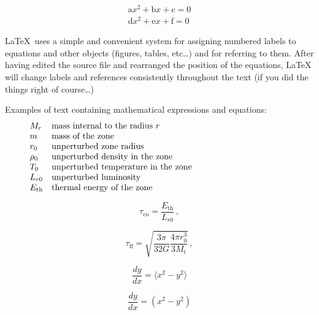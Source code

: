 \documentclass[a4paper,10pt]{article}
\begin{document}
\begin{eqnarray} \label{eqn:demo5}
{\mathrm a} x^2 + {\mathrm b} x + {\mathrm c} = 0 \nonumber \\
{\mathrm d} x^2 + {\mathrm e} x + {\mathrm f} = 0 \nonumber 
\end{eqnarray}


\LaTeX\, uses a simple and convenient system for assigning numbered labels
to equations and other objects (figures, tables, etc\ldots) and for referring
to them. After having edited the source file and rearranged the position of
the equations, \LaTeX\, will  change labels and references
consistently throughout the text (if you did the things right of
course\ldots) 
 
Examples of text containing mathematical expressions and equations: 
   \[
      \begin{array}{lp{0.8\linewidth}}
         M_{r}  & mass internal to the radius $r$     \\
         m               & mass of the zone                    \\
         r_0             & unperturbed zone radius             \\
         \rho_0          & unperturbed density in the zone     \\
         T_0             & unperturbed temperature in the zone \\
         L_{r0}          & unperturbed luminosity              \\
         E_{\mathrm{th}} & thermal energy of the zone
      \end{array}
   \]

\noindent
    
   \begin{equation}
      \tau_{\mathrm{co}} = \frac{E_{\mathrm{th}}}{L_{r0}} \,,
   \end{equation}


   \begin{equation}
      \tau_{\mathrm{ff}} =
         \sqrt{ 
	 	\frac{3 \pi}{32 G} \frac{4\pi r_0^3}{3 M_{\mathrm{r}}}
	 }\,,
   \end{equation}


\begin{equation}
 \displaystyle \frac{dy}{dx} = \langle x^2 - y^2 \rangle
\end{equation}

\begin{equation}
  \frac{dy}{dx} = \left ( x^2 - y^2 \right )
\end{equation}
\end{document}
